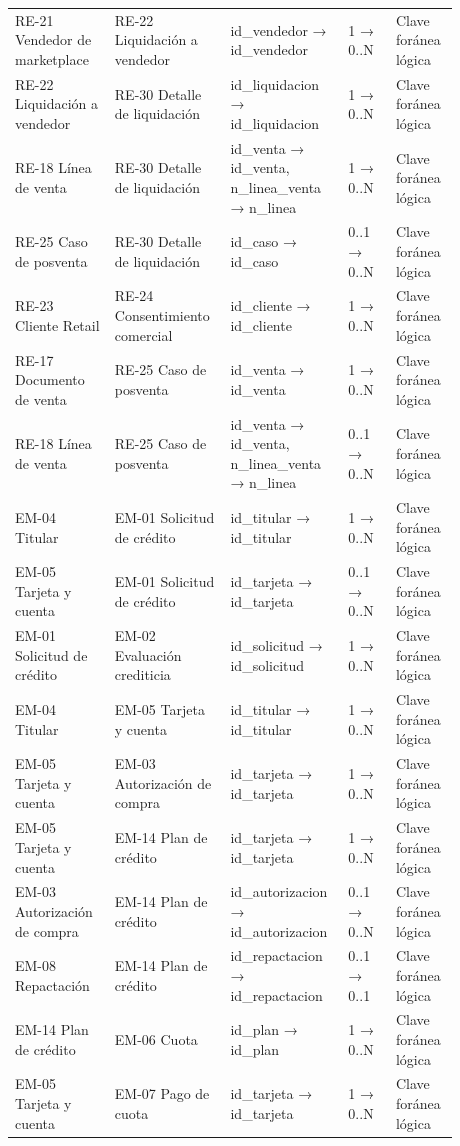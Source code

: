 \documentclass[11pt]{article}
\begin{document}
\begin{longtable}{@{}p{0.215\linewidth}p{0.215\linewidth}p{0.224\linewidth}p{0.103\linewidth}p{0.120\linewidth}@{}}
RE-21 Vendedor de marketplace & RE-22 Liquidación a vendedor & id\_vendedor → id\_vendedor & 1 → 0..N & Clave foránea lógica \\
RE-22 Liquidación a vendedor & RE-30 Detalle de liquidación & id\_liquidacion → id\_liquidacion & 1 → 0..N & Clave foránea lógica \\
RE-18 Línea de venta & RE-30 Detalle de liquidación & id\_venta → id\_venta, n\_linea\_venta → n\_linea & 1 → 0..N & Clave foránea lógica \\
RE-25 Caso de posventa & RE-30 Detalle de liquidación & id\_caso → id\_caso & 0..1 → 0..N & Clave foránea lógica \\
RE-23 Cliente Retail & RE-24 Consentimiento comercial & id\_cliente → id\_cliente & 1 → 0..N & Clave foránea lógica \\
RE-17 Documento de venta & RE-25 Caso de posventa & id\_venta → id\_venta & 1 → 0..N & Clave foránea lógica \\
RE-18 Línea de venta & RE-25 Caso de posventa & id\_venta → id\_venta, n\_linea\_venta → n\_linea & 0..1 → 0..N & Clave foránea lógica \\
EM-04 Titular & EM-01 Solicitud de crédito & id\_titular → id\_titular & 1 → 0..N & Clave foránea lógica \\
EM-05 Tarjeta y cuenta & EM-01 Solicitud de crédito & id\_tarjeta → id\_tarjeta & 0..1 → 0..N & Clave foránea lógica \\
EM-01 Solicitud de crédito & EM-02 Evaluación crediticia & id\_solicitud → id\_solicitud & 1 → 0..N & Clave foránea lógica \\
EM-04 Titular & EM-05 Tarjeta y cuenta & id\_titular → id\_titular & 1 → 0..N & Clave foránea lógica \\
EM-05 Tarjeta y cuenta & EM-03 Autorización de compra & id\_tarjeta → id\_tarjeta & 1 → 0..N & Clave foránea lógica \\
EM-05 Tarjeta y cuenta & EM-14 Plan de crédito & id\_tarjeta → id\_tarjeta & 1 → 0..N & Clave foránea lógica \\
EM-03 Autorización de compra & EM-14 Plan de crédito & id\_autorizacion → id\_autorizacion & 0..1 → 0..N & Clave foránea lógica \\
EM-08 Repactación & EM-14 Plan de crédito & id\_repactacion → id\_repactacion & 0..1 → 0..1 & Clave foránea lógica \\
EM-14 Plan de crédito & EM-06 Cuota & id\_plan → id\_plan & 1 → 0..N & Clave foránea lógica \\
EM-05 Tarjeta y cuenta & EM-07 Pago de cuota & id\_tarjeta → id\_tarjeta & 1 → 0..N & Clave foránea lógica \\

\end{longtable}
\end{document}
